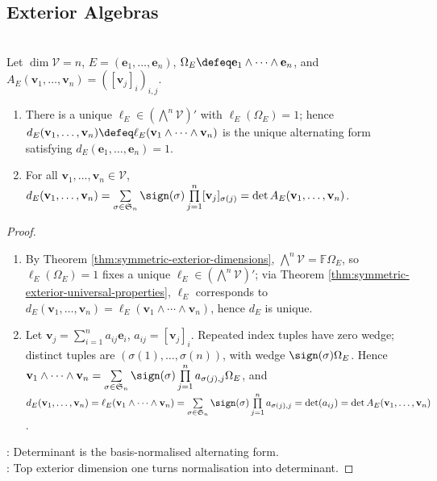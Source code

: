 \subsection{Exterior Algebras}

\begin{corollary} \label{cor:determinant-from-exterior-universal-property} \\
Let $\dim\mathcal{V}=n$, $E=(\mathbf{e}_1,\ldots,\mathbf{e}_n)$, $\Omega_E\defeq\mathbf{e}_1\wedge\cdots\wedge\mathbf{e}_n$, and $A_E(\mathbf{v}_1,\ldots,\mathbf{v}_n)=([\mathbf{v}_j]_i)_{i,j}$.
\begin{enumerate}[label=(\roman*)]
\setlength{\itemsep}{0pt}
\item There is a unique $\ell_E\in(\bigwedge^n\mathcal{V})'$ with $\ell_E(\Omega_E)=1$; hence $d_E(\mathbf{v}_1,\ldots,\mathbf{v}_n)\defeq\ell_E(\mathbf{v}_1\wedge\cdots\wedge\mathbf{v}_n)$ is the unique alternating form satisfying $d_E(\mathbf{e}_1,\ldots,\mathbf{e}_n)=1$.
\item For all $\mathbf{v}_1,\ldots,\mathbf{v}_n\in\mathcal{V}$, $d_E(\mathbf{v}_1,\ldots,\mathbf{v}_n) =\sum\limits_{\sigma\in\mathfrak{S}_n}\sign(\sigma)\prod\limits_{j=1}^{n}[\mathbf{v}_j]_{\sigma(j)} =\det A_E(\mathbf{v}_1,\ldots,\mathbf{v}_n)$.
\end{enumerate}
\begin{proof}
\begin{enumerate}[label=(\roman*)]
\setlength{\itemsep}{0pt}
\item By Theorem \ref{thm:symmetric-exterior-dimensions}, $\bigwedge^n\mathcal{V}=\mathbb{F}\Omega_E$, so $\ell_E(\Omega_E)=1$ fixes a unique $\ell_E\in(\bigwedge^n\mathcal{V})'$; via Theorem \ref{thm:symmetric-exterior-universal-properties}, $\ell_E$ corresponds to $d_E(\mathbf{v}_1,\ldots,\mathbf{v}_n)=\ell_E(\mathbf{v}_1\wedge\cdots\wedge\mathbf{v}_n)$, hence $d_E$ is unique.
\item Let $\mathbf{v}_j=\sum_{i=1}^{n}a_{ij}\mathbf{e}_i$, $a_{ij}=[\mathbf{v}_j]_i$. Repeated index tuples have zero wedge; distinct tuples are $(\sigma(1),\ldots,\sigma(n))$, with wedge $\sign(\sigma)\Omega_E$. Hence $\mathbf{v}_1\wedge\cdots\wedge\mathbf{v}_n =\sum\limits_{\sigma\in\mathfrak{S}_n}\sign(\sigma)\prod\limits_{j=1}^{n}a_{\sigma(j),j}\Omega_E$, and\\
$d_E(\mathbf{v}_1,\ldots,\mathbf{v}_n) =\ell_E(\mathbf{v}_1\wedge\cdots\wedge\mathbf{v}_n) =\sum\limits_{\sigma\in\mathfrak{S}_n}\sign(\sigma)\prod\limits_{j=1}^{n}a_{\sigma(j),j}\\ =\det(a_{ij}) =\det A_E(\mathbf{v}_1,\ldots,\mathbf{v}_n)$.
\end{enumerate}
: Determinant is the basis-normalised alternating form.\\
: Top exterior dimension one turns normalisation into determinant.
\end{proof}
\end{corollary}

